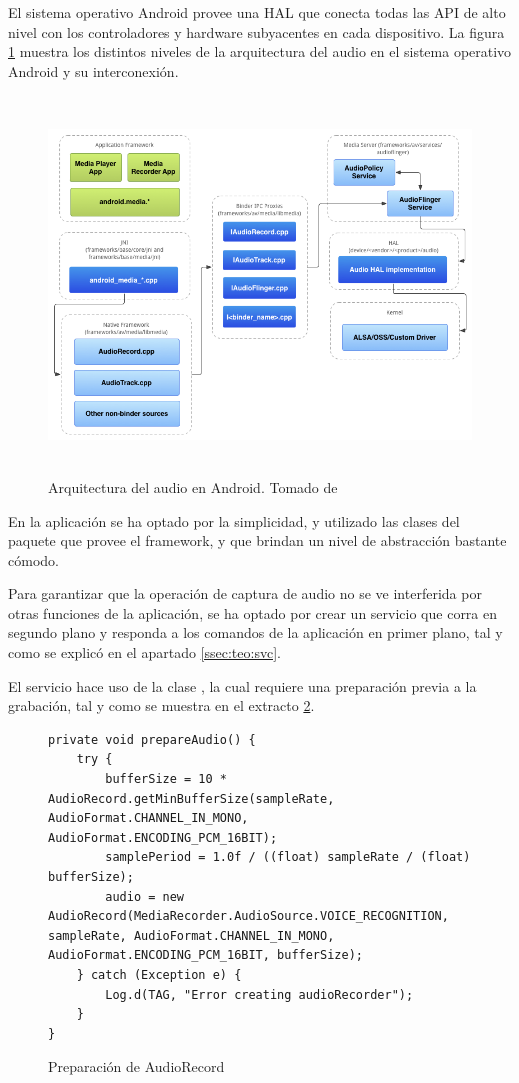 El sistema operativo Android provee una \ac{HAL} que conecta todas las \ac{API} de alto nivel con los controladores y hardware subyacentes en cada dispositivo. La figura \ref{fig:diagrama:audiohal} muestra los distintos niveles de la arquitectura del audio en el sistema operativo Android y su interconexión.
\begin{figure}[h] \centering
    \includegraphics[height=10cm]{graphs/audio_hal.png} \caption{Arquitectura del audio en Android. Tomado de \cite{audiohal}}\label{fig:diagrama:audiohal}
\end{figure}

En la aplicación se ha optado por la simplicidad, y utilizado las clases del paquete  que provee el framework, y que brindan un nivel de abstracción bastante cómodo.

Para garantizar que la operación de captura de audio no se ve interferida por otras funciones de la aplicación, se ha optado por crear un servicio que corra en segundo plano y responda a los comandos de la aplicación en primer plano, tal y como se explicó en el apartado \ref{ssec:teo:svc}.

El servicio hace uso de la clase , la cual requiere una preparación previa a la grabación, tal y como se muestra en el extracto \ref{code:audioprep}.

\begin{figure}[h] 
\begin{verbatim}
private void prepareAudio() {
    try {
        bufferSize = 10 * AudioRecord.getMinBufferSize(sampleRate, AudioFormat.CHANNEL_IN_MONO, AudioFormat.ENCODING_PCM_16BIT);
        samplePeriod = 1.0f / ((float) sampleRate / (float) bufferSize);
        audio = new AudioRecord(MediaRecorder.AudioSource.VOICE_RECOGNITION, sampleRate, AudioFormat.CHANNEL_IN_MONO, AudioFormat.ENCODING_PCM_16BIT, bufferSize);
    } catch (Exception e) {
        Log.d(TAG, "Error creating audioRecorder");
    }
}
\end{verbatim}
\caption{Preparación de AudioRecord}
\label{code:audioprep}
\end{figure}

